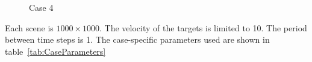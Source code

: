 \begin{figure}%
\caption{Case 4}%
\label{fig:EgScen4}%
\end{figure}

Each scene is $1000 \times 1000$. The velocity of the targets is limited to 10. The period between time steps is 1. The case-specific parameters used are shown in table~\ref{tab:CaseParameters}

